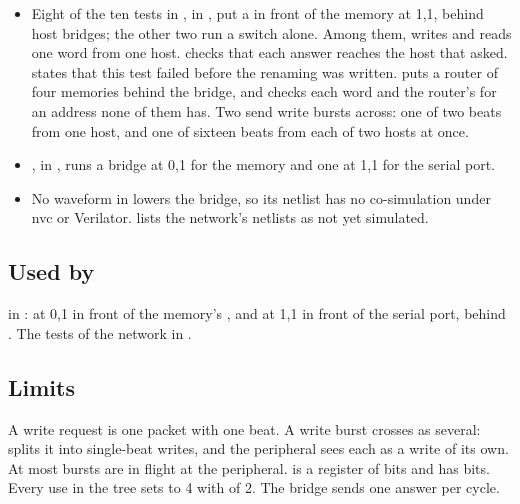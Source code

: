 \begin{itemize}
\item Eight of the ten tests in , in
, put a
 in front of the memory
at 1,1, behind host bridges; the other two run a switch alone.
Among them,
writes and reads one word from one host.
 checks
that each answer reaches the host that asked.  states
that this test failed before the renaming was written.
 puts a router of four
memories behind the bridge, and checks each word and the router's
 for an address none of them has.
Two send write bursts across: one of two beats from one host, and
one of sixteen beats from each of two hosts at once.
\item {}, in
, runs a bridge at 0,1 for the memory and one at
1,1 for the serial port.
\item No waveform in  lowers the bridge, so its
netlist has no co-simulation under nvc or Verilator.
 lists the network's netlists as not yet
simulated.
\end{itemize}

\subsection*{Used by}

 in : at 0,1 in front of the
memory's , and at 1,1 in front of the serial port, behind
. The tests of the network in
.

\subsection*{Limits}

A write request is one packet with one beat. A write burst crosses as
several:  splits it into single-beat writes, and the
peripheral sees each as a write of its own. At most  bursts are in
flight at the peripheral.  is a register of  bits
and  has  bits. Every use in the tree sets
 to 4 with  of 2. The bridge sends one answer per
cycle.
